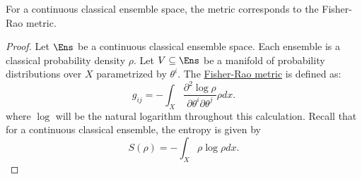 \begin{mathSection}
\begin{prop}
	For a continuous classical ensemble space, the metric corresponds to the Fisher-Rao metric.
\end{prop}

\begin{proof}
	Let $\Ens$ be a continuous classical ensemble space. Each ensemble is a classical probability density $\rho$. Let $V \subseteq \Ens$ be a manifold of probability distributions over $X$ parametrized by $\theta^i$. The \href{https://en.wikipedia.org/wiki/Fisher_information_metric}{Fisher-Rao metric} is defined as:
	\begin{equation}
		g_{ij} =- \int_X \frac{\partial^2 \log \rho}{\partial \theta^i \partial \theta^j} \rho dx.
	\end{equation}
	where $\log$ will be the natural logarithm throughout this calculation. Recall that for a continuous classical ensemble, the entropy is given by
	\begin{equation}
		S(\rho) =- \int_X \rho \log \rho dx.
	\end{equation}
	

\end{proof}
\end{mathSection}
